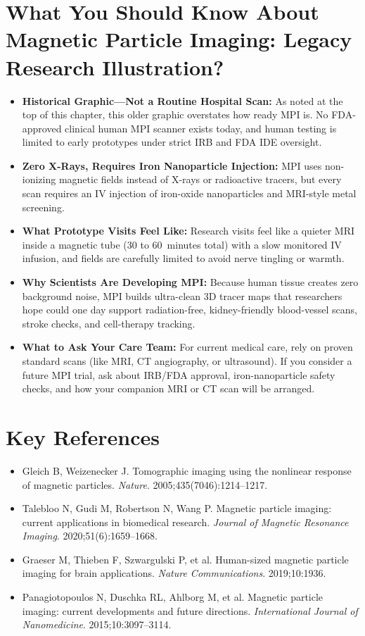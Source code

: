 \section{What You Should Know About Magnetic Particle Imaging: Legacy Research Illustration?}
\begin{itemize}
  \item \textbf{Historical Graphic---Not a Routine Hospital Scan:} As noted at the top of this chapter, this older graphic overstates how ready MPI is. No FDA-approved clinical human MPI scanner exists today, and human testing is limited to early prototypes under strict IRB and FDA IDE oversight.
  \item \textbf{Zero X-Rays, Requires Iron Nanoparticle Injection:} MPI uses non-ionizing magnetic fields instead of X-rays or radioactive tracers, but every scan requires an IV injection of iron-oxide nanoparticles and MRI-style metal screening.
  \item \textbf{What Prototype Visits Feel Like:} Research visits feel like a quieter MRI inside a magnetic tube (30 to 60~minutes total) with a slow monitored IV infusion, and fields are carefully limited to avoid nerve tingling or warmth.
  \item \textbf{Why Scientists Are Developing MPI:} Because human tissue creates zero background noise, MPI builds ultra-clean 3D tracer maps that researchers hope could one day support radiation-free, kidney-friendly blood-vessel scans, stroke checks, and cell-therapy tracking.
  \item \textbf{What to Ask Your Care Team:} For current medical care, rely on proven standard scans (like MRI, CT angiography, or ultrasound). If you consider a future MPI trial, ask about IRB/FDA approval, iron-nanoparticle safety checks, and how your companion MRI or CT scan will be arranged.
\end{itemize}

\section{Key References}
\begin{itemize}
  \item Gleich B, Weizenecker J. Tomographic imaging using the nonlinear response of magnetic particles. \emph{Nature}. 2005;435(7046):1214--1217.
  \item Talebloo N, Gudi M, Robertson N, Wang P. Magnetic particle imaging: current applications in biomedical research. \emph{Journal of Magnetic Resonance Imaging}. 2020;51(6):1659--1668.
  \item Graeser M, Thieben F, Szwargulski P, et al. Human-sized magnetic particle imaging for brain applications. \emph{Nature Communications}. 2019;10:1936.
  \item Panagiotopoulos N, Duschka RL, Ahlborg M, et al. Magnetic particle imaging: current developments and future directions. \emph{International Journal of Nanomedicine}. 2015;10:3097--3114.
\end{itemize}
